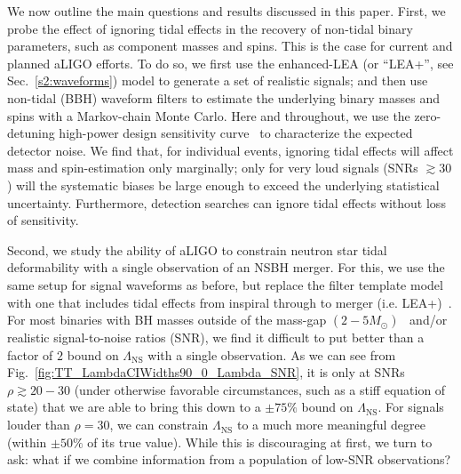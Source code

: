 \documentclass[aps,prd,amsmath,floats,floatfix, twocolumn,
superscriptaddress,nofootinbib,showpacs]{revtex4-1}
\newcommand{\red}{\textcolor{red}}
\newcommand{\prayush}{\textcolor{red!40!black}}
\newcommand{\lambdans}{\Lambda_\mathrm{NS}}
\begin{document}
We now outline the main questions and results discussed in this paper.
First, we probe the effect of ignoring tidal effects in
the recovery of non-tidal binary parameters, such as 
component masses and spins. This is the case for current and planned aLIGO
efforts.
To do so, we first use the enhanced-LEA (or ``LEA+'', see Sec.~\ref{s2:waveforms})
model to generate a set of realistic signals;
and then use non-tidal (BBH) waveform filters to estimate the underlying
binary masses and spins with a Markov-chain Monte Carlo. Here and throughout,
we use the zero-detuning high-power design sensitivity curve~\cite{Shoemaker2009}
to characterize the expected detector noise.
% 
We find that, for individual events, ignoring tidal effects will affect mass
and spin-estimation only marginally; only for very loud signals (SNRs $\gtrsim 30$)
will the systematic biases be large enough to exceed the underlying
statistical uncertainty. Furthermore, detection searches can ignore tidal
effects without loss of sensitivity.



Second, we study the ability of aLIGO to constrain neutron star tidal 
deformability with a single observation of an NSBH merger. For this, we
use the same setup for signal waveforms as before, but replace the filter
template model with one that includes tidal effects from inspiral
through to merger (i.e. LEA+)~\cite{Lackey:2013axa}. For most binaries with
BH masses outside of the mass-gap $(2-5M_\odot)$~\cite{Bailyn:1997xt,
Kalogera:1996ci,Kreidberg:2012,Littenberg:2015tpa} and/or realistic signal-to-noise
ratios (SNR), we find it difficult to put better than a factor of $2$ bound
on $\lambdans$ with a single observation. As we can see from
Fig.~\ref{fig:TT_LambdaCIWidths90_0_Lambda_SNR}, it is only at SNRs 
$\rho\gtrsim 20-30$ (under otherwise favorable circumstances, such as a stiff
equation of state) that we are able
to bring this down to a $\pm 75\%$ bound on $\lambdans$. For signals louder
than $\rho =30$, we can constrain $\lambdans$ to a much more meaningful degree
(within $\pm 50\%$ of its true value).
While this is discouraging at first, we turn to ask: what if we combine
information from a population of low-SNR observations?
\end{document}
